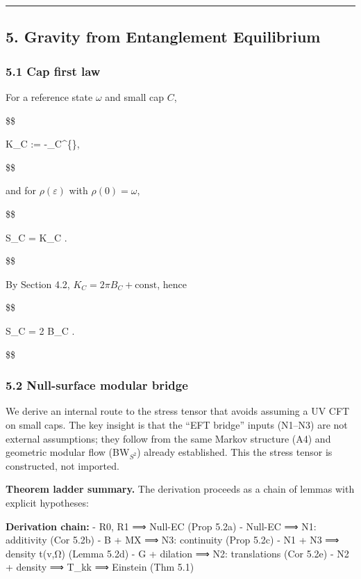 \documentclass[11pt,a4paper]{article}
\theoremstyle{remark}
\begin{document}
\begin{center}\rule{0.5\linewidth}{0.5pt}\end{center}

\subsection{5. Gravity from Entanglement Equilibrium}\label{gravity-from-entanglement-equilibrium}

\subsubsection{5.1 Cap first law}\label{cap-first-law}

For a reference state \(\omega\) and small cap \(C\),

\$\$

K\_C := -\log \rho\_C\^{}\{\omega\},

\$\$

and for \(\rho(\varepsilon)\) with \(\rho(0)=\omega\),

\$\$

\delta S\_C = \delta \langle K\_C \rangle.

\$\$

By Section 4.2, \(K_C = 2\pi B_C + \text{const}\), hence

\$\$

\delta S\_C = 2 \pi \delta \langle B\_C \rangle.

\$\$

\subsubsection{5.2 Null-surface modular bridge}\label{null-surface-modular-bridge}

We derive an internal route to the stress tensor that avoids assuming a UV
CFT on small caps. The key insight is that the ``EFT bridge'' inputs (N1--N3)
are not external assumptions; they follow from the same Markov structure
(A4) and geometric modular flow (BW\(_{S^2}\)) already established. This
the stress tensor is constructed, not imported.

\textbf{Theorem ladder summary.} The derivation proceeds as a chain of lemmas with
explicit hypotheses:

\textbf{Derivation chain:}
- R0, R1 ⟹ Null-EC (Prop 5.2a)
- Null-EC ⟹ N1: additivity (Cor 5.2b)
- B + MX ⟹ N3: continuity (Prop 5.2c)
- N1 + N3 ⟹ density t(v,Ω) (Lemma 5.2d)
- G + dilation ⟹ N2: translations (Cor 5.2e)
- N2 + density ⟹ T\_kk ⟹ Einstein (Thm 5.1)
\end{document}
